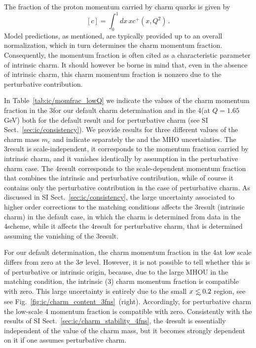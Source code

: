 
The fraction of the proton momentum carried by charm quarks
is given by
\begin{equation}
\label{eq:ic/charm_momentum_fraction}
\left[ c\right] = \int_0^1dx\, x c^+(x,Q^2) \, .
\end{equation}
Model predictions, as mentioned, are typically provided up to an
overall normalization, which in turn determines the charm momentum fraction.
%
Consequently, the momentum fraction is often cited as a characteristic
parameter of intrinsic charm.
%
It should however be borne in mind that,
even in the absence of intrinsic charm, this charm momentum fraction is nonzero due
to the perturbative contribution.

In Table~\ref{tab:ic/momfrac_lowQ} we indicate
the values of the charm momentum fraction
 in the 3\fns for our default charm
  determination and in the 4\fns  (at $Q=1.65$ GeV) both for the
  default result and for perturbative charm \pdf (see SI Sect.~\ref{sec:ic/consistency}).
%
We provide results for  three different values of the charm mass $m_c$ and
indicate separately the \pdf and the MHO uncertainties.
%
The 3\fns result is scale-independent, it corresponds to the
momentum fraction carried by intrinsic charm, and it vanishes identically
by assumption in the perturbative charm case.
%
The 4\fns result corresponds to
the scale-dependent momentum fraction that combines the intrinsic and
perturbative contribution, while of course it contains only the
perturbative contribution in the case of perturbative charm.
%
As
discussed in SI Sect.~\ref{sec:ic/consistency}, the large uncertainty
associated to higher order corrections to the matching conditions
affects the 3\fns result (intrinsic charm) in the default case, in
which the charm \pdf is determined from data in the 4\fns scheme, while
it affects the 4\fns result for perturbative charm, that is determined
assuming the vanishing of the 3\fns result.

 For our default determination, the charm
momentum fraction in the 4\fns at low scale
differs from zero at the $3\sigma$
level.
%
However, it is not possible to tell whether this is of
perturbative or intrinsic origin, because, due to  the large MHOU in
the matching condition, the intrinsic (3\fns) charm momentum fraction
is compatible with zero. This large uncertainty is entirely due to the
small $x\lsim 0.2$ region, see see
Fig.~\ref{fig:ic/charm_content_3fns}~(right).
%
Accordingly, for perturbative charm the
low-scale 4\fns
momentum fraction is compatible with zero.
%
Consistently with the results of SI Sect.~\ref{sec:ic/charm_stability_4fns},
the 4\fns result is essentially independent of the value of the charm
mass, but it becomes strongly dependent on it if one assumes
perturbative charm.

